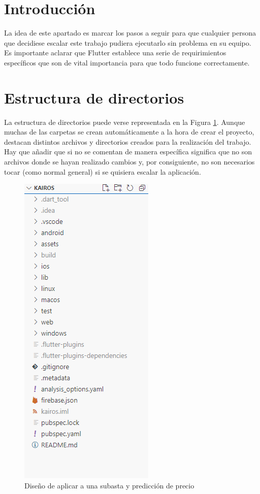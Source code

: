 
\section{Introducción}

	La idea de este apartado es marcar los pasos a seguir para que cualquier persona que decidiese escalar este trabajo pudiera ejecutarlo sin problema en su equipo. Es importante aclarar que Flutter establece una serie de requirimientos específicos que son de vital importancia para que todo funcione correctamente.

\section{Estructura de directorios}

	La estructura de directorios puede verse representada en la Figura \ref{fig:directorios}. Aunque muchas de las carpetas se crean automáticamente a la hora de crear el proyecto, destacan distintos archivos y directorios creados para la realización del trabajo. Hay que añadir que si no se comentan de manera específica significa que no son archivos donde se hayan realizado cambios y, por consiguiente, no son necesarios tocar (como normal general) si se quisiera escalar la aplicación.
	
\begin{figure}[H]
    \centering
    \includegraphics[width=0.5\linewidth]{img/directorios.png}
    \caption{Diseño de aplicar a una subasta y predicción de precio}
    \label{fig:directorios}
\end{figure}

